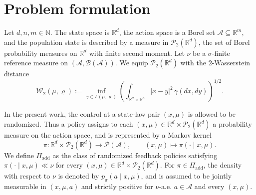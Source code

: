 \documentclass[a4paper, 10pt, english, reqno]{amsart}
\begin{document}
\section{Problem formulation}
\label{sec:formulation}

Let $d,n,m\in\mathbb N$. The state space is $\mathbb R^d$, the action space is a Borel set $\mathcal A\subseteq \mathbb R^m$, and the population state is described by a measure in $\mathcal P_2(\mathbb R^d)$, the set of Borel probability measures on $\mathbb R^d$ with finite second moment. Let $\nu$ be a $\sigma$-finite reference measure on $(\mathcal A,\mathcal B(\mathcal A))$. We equip $\mathcal P_2(\mathbb R^d)$ with the $2$-Wasserstein distance
\[
  \mathcal W_2(\mu,\varrho)
  :=
  \inf_{\gamma\in\Gamma(\mu,\varrho)}
  \left(
    \int_{\mathbb R^d\times\mathbb R^d}
    |x-y|^2\,\gamma(dx,dy)
  \right)^{1/2}.
\]

In the present work, the control at a state-law pair $(x,\mu)$ is allowed to be randomized. Thus a policy assigns to each $(x,\mu)\in\mathbb R^d\times\mathcal P_2(\mathbb R^d)$ a probability measure on the action space, and is represented by a Markov kernel
\[
  \pi:\mathbb R^d\times\mathcal P_2(\mathbb R^d)
  \longrightarrow
  \mathcal P(\mathcal A),
  \qquad
  (x,\mu)\longmapsto \pi(\cdot\mid x,\mu).
\]
We define $\Pi_{\mathrm{add}}$ as the class of randomized feedback policies satisfying $\pi(\cdot\mid x,\mu)\ll\nu$ for every $(x,\mu)\in\mathbb R^d\times\mathcal P_2(\mathbb R^d)$. For $\pi\in\Pi_{\mathrm{add}}$, the density with respect to $\nu$ is denoted by $p_\pi(a\mid x,\mu)$, and is assumed to be jointly measurable in $(x,\mu,a)$ and strictly positive for $\nu$-a.e. $a\in\mathcal A$ and every $(x,\mu)$.
\end{document}
